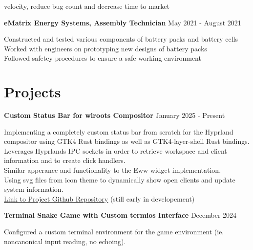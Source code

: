 \documentclass[letter,12pt]{article}
\begin{document}
velocity, reduce bug count and decrease time to market\\
\begin{tcolorbox}
[colback=gray!25,
  leftrule=0pt,
  rightrule=0pt,
  sharp corners]
 \textbf{eMatrix Energy Systems, Assembly Technician}
\hfill May 2021 - August 2021 
\end{tcolorbox}
\noindent 
\textbullet \- Constructed and tested various components of
battery packs and battery cells\\ 
\textbullet \- Worked with engineers on prototyping new designs of battery packs\\
\textbullet \- Followed safetey procedures to ensure a safe working environment
\vspace{-.5cm} 

\section*{Projects} 
\vspace{-.25cm}
\begin{tcolorbox}
[colback=gray!25,
  leftrule=0pt,
  rightrule=0pt,
  sharp corners]
    \textbf{Custom Status Bar for wlroots Compositor}
    \hfill January 2025 - Present
\end{tcolorbox}
\noindent
\textbullet \- Implementing a completely custom status
bar from scratch for the Hyprland compositor using
GTK4 Rust bindings as well as GTK4-layer-shell Rust bindings.\\
\textbullet \- Leverages Hyprlands IPC sockets in
order to retrieve workspace and client information and
to create click handlers.\\
\textbullet \- Similar apperance and functionality to
the Eww widget implementation.\\
\textbullet \- Using svg files from icon theme to dynamically
show open clients and update system information.\\
\textbullet \- {\color{cyan}\underline{\href{https://github.com/DMGDy/epic-bar-rs}{Link to Project Github Repository}}} (still early in developement)
\begin{tcolorbox}
[colback=gray!25,
  leftrule=0pt,
  rightrule=0pt,
  sharp corners]
\noindent\textbf{Terminal Snake Game with Custom termios Interface}
\hfill December 2024
\end{tcolorbox}
\noindent
\textbullet \- Configured a custom terminal environment
for the game environment (ie. noncanonical input reading, no echoing).\\
\end{document}
